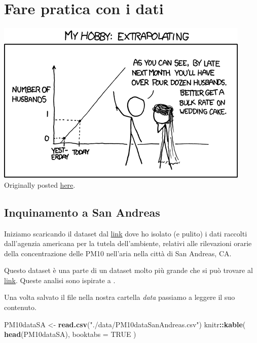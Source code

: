 \documentclass[]{book}
\newenvironment{Shaded}{\begin{snugshade}}{\end{snugshade}}
\newcommand{\DataTypeTok}[1]{\textcolor[rgb]{0.13,0.29,0.53}{#1}}
\newcommand{\KeywordTok}[1]{\textcolor[rgb]{0.13,0.29,0.53}{\textbf{#1}}}
\newcommand{\NormalTok}[1]{#1}
\newcommand{\OperatorTok}[1]{\textcolor[rgb]{0.81,0.36,0.00}{\textbf{#1}}}
\newcommand{\OtherTok}[1]{\textcolor[rgb]{0.56,0.35,0.01}{#1}}
\newcommand{\StringTok}[1]{\textcolor[rgb]{0.31,0.60,0.02}{#1}}
\begin{document}
\hypertarget{fare-pratica-con-i-dati}{%
\chapter{Fare pratica con i dati}\label{fare-pratica-con-i-dati}}

\includegraphics{media/extrapolating.png}
Originally posted \href{https://xkcd.com/605/}{here}.

\hypertarget{inquinamento-a-san-andreas}{%
\section{Inquinamento a San Andreas}\label{inquinamento-a-san-andreas}}

Iniziamo scaricando il dataset dal \href{https://www.dropbox.com/s/9zx2dtne9gnafcm/PM10dataSanAndreas.csv?dl=1}{link} dove ho isolato (e pulito) i dati raccolti dall'agenzia americana per la tutela dell'ambiente, relativi alle rilevazioni orarie della concentrazione delle PM10 nell'aria nella città di San Andreas, CA.

Questo dataset è una parte di un dataset molto più grande che si può trovare al \href{http://aqsdr1.epa.gov/aqsweb/aqstmp/airdata/download_files.html\#Raw}{link}. Queste analisi sono ispirate a \citep{Peng2015}.

Una volta salvato il file nella nostra cartella \emph{data} passiamo a leggere il suo contenuto.

\begin{Shaded}
\begin{Highlighting}[]
\NormalTok{PM10dataSA <-}\StringTok{ }\KeywordTok{read.csv}\NormalTok{(}\StringTok{"./data/PM10dataSanAndreas.csv"}\NormalTok{)}
\NormalTok{knitr}\OperatorTok{::}\KeywordTok{kable}\NormalTok{(}
\KeywordTok{head}\NormalTok{(PM10dataSA),}
\DataTypeTok{booktabs =} \OtherTok{TRUE}
\NormalTok{)}
\end{Highlighting}
\end{Shaded}
\end{document}
